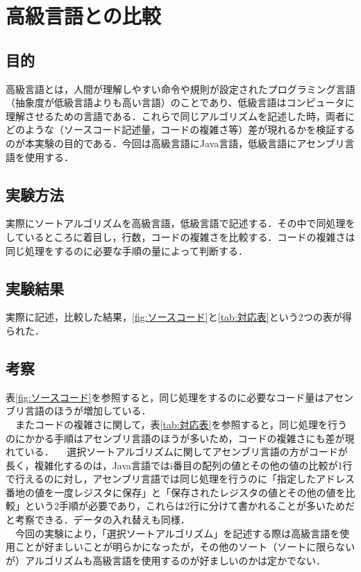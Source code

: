 \chapter{高級言語との比較}
\section{目的}
高級言語とは，人間が理解しやすい命令や規則が設定されたプログラミング言語（抽象度が低級言語よりも高い言語）のことであり、低級言語はコンピュータに理解させるための言語である．これらで同じアルゴリズムを記述した時，両者にどのような（ソースコード記述量，コードの複雑さ等）差が現れるかを検証するのが本実験の目的である．今回は高級言語にJava言語，低級言語にアセンブリ言語を使用する．

\section{実験方法}
実際にソートアルゴリズムを高級言語，低級言語で記述する．その中で同処理をしているところに着目し，行数，コードの複雑さを比較する．コードの複雑さは同じ処理をするのに必要な手順の量によって判断する．

\section{実験結果}
実際に記述，比較した結果，\ref{fig:ソースコード}と\ref{tab:対応表}という2つの表が得られた．

\section{考察}
 表\ref{fig:ソースコード}を参照すると，同じ処理をするのに必要なコード量はアセンブリ言語のほうが増加している．\\
 \ \ またコードの複雑さに関して，表\ref{tab:対応表}を参照すると，同じ処理を行うのにかかる手順はアセンブリ言語のほうが多いため，コードの複雑さにも差が現れている．
 \ \ 選択ソートアルゴリズムに関してアセンブリ言語の方がコードが長く，複雑化するのは，Java言語ではi番目の配列の値とその他の値の比較が1行で行えるのに対し，アセンブリ言語では同じ処理を行うのに「指定したアドレス番地の値を一度レジスタに保存」と「保存されたレジスタの値とその他の値を比較」という2手順が必要であり，これらは2行に分けて書かれることが多いためだと考察できる．データの入れ替えも同様．\\
 \ \ 今回の実験により，「選択ソートアルゴリズム」を記述する際は高級言語を使用ことが好ましいことが明らかになったが，その他のソート（ソートに限らないが）アルゴリズムも高級言語を使用するのが好ましいのかは定かでない．





